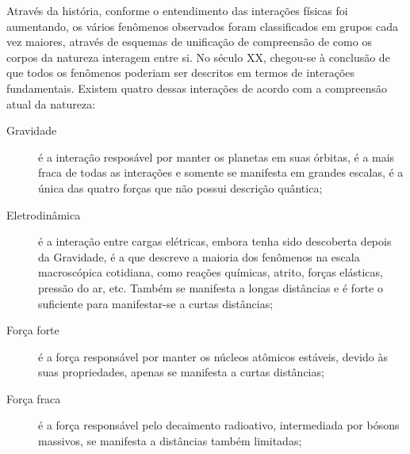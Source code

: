 Através da história, conforme o entendimento das interações físicas foi aumentando,
os vários fenômenos observados foram classificados em grupos cada vez maiores, através
de esquemas de unificação de compreensão de como os corpos da natureza interagem entre si.
No século XX, chegou-se à conclusão de que todos os fenômenos poderiam ser descritos em termos
de interações fundamentais. Existem quatro dessas interações de acordo com a compreensão
atual da natureza:

\begin{description}
 \item [Gravidade] é a interação resposável por manter os planetas em suas órbitas, é a mais
 fraca de todas as interações e somente se manifesta em grandes escalas, é a única das quatro
 forças que não possui descrição quântica;
 \item [Eletrodinâmica] é a interação entre cargas elétricas, embora tenha sido descoberta depois da Gravidade,
 é a que descreve a maioria dos fenômenos na escala macroscópica cotidiana, como reações químicas, atrito, forças elásticas,
 pressão do ar, etc. Também se manifesta a longas distâncias e é forte o suficiente para manifestar-se a curtas distâncias;
 \item [Força forte] é a força responsável por manter os núcleos atômicos estáveis, devido 
 às suas propriedades, apenas se manifesta a curtas distâncias;
 \item [Força fraca] é a força responsável pelo decaimento radioativo, intermediada por bósons
 massivos, se manifesta a distâncias também limitadas;
\end{description}

